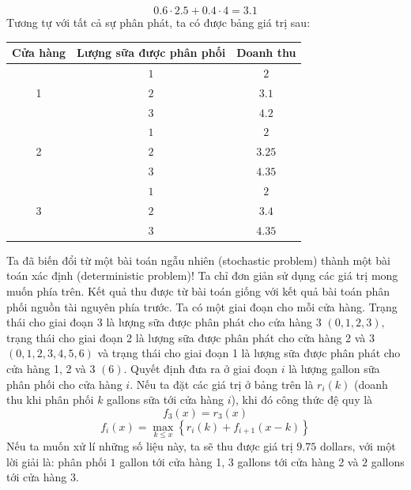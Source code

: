 \documentclass[12pt,a4paper]{article}
\begin{document}
\[0.6 \cdot 2.5 + 0.4 \cdot 4 = 3.1\]
Tương tự với tất cả sự phân phát, ta có được bảng giá trị sau:
\begin{center}
\begin{table}[H]
\begin{tabular}{|c|c|c|}
\hline 
Cửa hàng & Lượng sữa được phân phối & Doanh thu \\ 
\hline 
\multirow{3}{*}{1} & \(1\) & \(2\) \\  
 & \(2\) & \(3.1\) \\ 
 & \(3\) & \(4.2\) \\ 
\hline 
\multirow{3}{*}{2} & \(1\) & \(2\) \\ 
 & \(2\) & \(3.25\) \\ 
 & \(3\) & \(4.35\) \\ 
\hline 
\multirow{3}{*}{3}& \(1\) & \(2\) \\ 
 & \(2\) & \(3.4\) \\ 
 & \(3\) & \(4.35\) \\ 
\hline 
\end{tabular} 
\end{table}
\end{center}
Ta đã biến đổi từ một bài toán ngẫu nhiên (stochastic problem) thành một bài toán xác định (deterministic problem)! Ta chỉ đơn giản sử dụng các giá trị mong muốn phía trên. Kết quả thu được từ bài toán giống với kết quả bài toán phân phối nguồn tài nguyên phía trước. Ta có một giai đoạn cho mỗi cửa hàng. Trạng thái cho giai đoạn 3 là lượng sữa được phân phát cho cửa hàng 3 \(\left( {0,1,2,3} \right),\) trạng thái cho giai đoạn 2 là lượng sữa được phân phát cho cửa hàng 2 và 3 \(\left( {0,1,2,3,4,5,6} \right)\) và trạng thái cho giai đoạn 1 là lượng sữa được phân phát cho cửa hàng 1, 2 và 3 \(\left( 6 \right).\) Quyết định đưa ra ở giai đoạn \(i\) là lượng gallon sữa phân phối cho cửa hàng \(i.\) Nếu ta đặt các giá trị ở bảng trên là \(r_i \left( k \right)\) (doanh thu khi phân phối \(k\) gallons sữa tới cửa hàng \(i\)), khi đó công thức đệ quy là
\[{f_3}\left( x \right) = {r_3}\left( x \right)\]
\[{f_i}\left( x \right) = \mathop {\max }\limits_{k \leqslant x} \left\{ {{r_i}\left( k \right) + {f_{i + 1}}\left( {x - k} \right)} \right\}\]
Nếu ta muốn xử lí những số liệu này, ta sẽ thu được giá trị \(9.75\) dollars, với một lời giải là: phân phối \(1\) gallon tới cửa hàng 1, \(3\) gallons tới cửa hàng 2 và \(2\) gallons tới cửa hàng 3.
\end{document}

